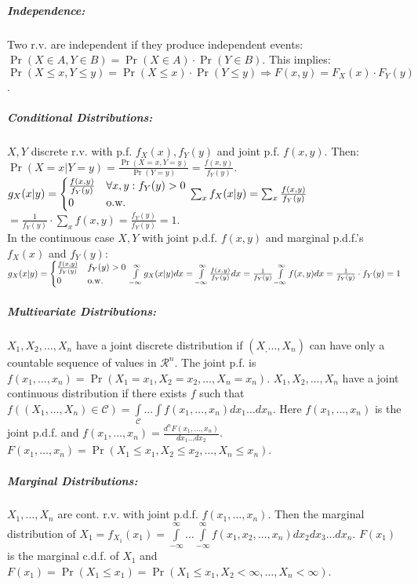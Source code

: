 \documentclass[landscape,10pt]{article}
\begin{document}
\begin{multicols}{4}
    \subparagraph*{Independence: }
        Two r.v. are independent if they produce independent events: \(\Pr(X \in A, Y \in B) = \Pr(X \in A) \cdot \Pr(Y \in B)\). This implies: \(\Pr(X \leq x, Y \leq y) = \Pr(X \leq x) \cdot \Pr(Y \leq y) \Rightarrow F(x,y) = F_X(x) \cdot F_Y(y)\).

    \subparagraph*{Conditional Distributions: }
        \(X, Y\) discrete r.v. with p.f. \(f_X(x), f_Y(y)\) and joint p.f. \(f(x,y)\). Then: \\
        \(\Pr(X = x | Y = y) = \frac{\Pr(X = x, Y = y)}{\Pr(Y = y)} = \frac{f(x,y)}{f_Y(y)}\). \\
        \(g_X(x|y) = \begin{cases} \frac{f(x,y)}{f_Y(y)} & \forall x,y: f_Y(y) > 0 \\ 0 & \text{o.w.}\end{cases} \\
        \sum_x{f_X(x|y)} = \sum_x{\frac{f(x,y)}{f_Y(y)}} \)
             \(= \frac{1}{f_Y(y)} \cdot \sum_x{f(x,y)} = \frac{f_Y(y)}{f_Y(y)} = 1\). \\
    In the continuous case \(X, Y\) with joint p.d.f. \(f(x,y)\) and marginal p.d.f.'s \(f_X(x)\) and \(f_Y(y)\): \\
    \(g_X(x|y) = \begin{cases} \frac{f(x,y)}{f_Y(y)} & f_Y(y) > 0 \\ 0 & \text{o.w.} \end{cases} \\
    \int\limits_{-\infty}^{\infty}g_X(x|y)dx = \int\limits_{-\infty}^{\infty} \frac{f(x,y)}{f_Y(y)}dx = \frac{1}{f_Y(y)} \int\limits_{-\infty}^{\infty}f(x,y)dx = \frac{1}{f_Y(y)} \cdot f_Y(y) = 1\)

\subparagraph*{Multivariate Distributions:}
 \(X_1, X_2, \ldots, X_n\) have a joint discrete distribution if \((X_, \dots, X_n)\) can have only a countable sequence of values in \(\mathcal{R}^n\). The joint p.f. is \(f(x_1,\dots,x_n) = \Pr(X_1=x_1, X_2=x_2,\ldots,X_n=x_n)\). \(X_1, X_2, \ldots, X_n\) have a joint continuous distribution if there exists \(f\) such that \(f\left((X_1,\ldots,X_n)\in \mathcal{C}\right) = \int\limits_{\mathcal{C}}\dots\int f(x_1,\ldots,x_n)dx_1\ldots dx_n\). Here \(f(x_1,\ldots,x_n)\) is the joint p.d.f. and \(f(x_1,\ldots,x_n) = \frac{d^nF(x_1,\ldots,x_n)}{dx_1\ldots dx_2}\). \(F(x_1,\ldots,x_n) = \Pr(X_1 \leq x_1, X_2 \leq x_2, \ldots, X_n \leq x_n)\).

 \subparagraph*{Marginal Distributions: }
    \(X_1, \ldots, X_n\) are cont. r.v. with joint p.d.f. \(f(x_1, \ldots, x_n)\). Then the marginal distribution of \(X_1 = f_{X_1}(x_1) = \int\limits_{- \infty}^{\infty} \dots \int\limits_{- \infty}^{\infty} f(x_1,x_2, \ldots, x_n)dx_2dx_3\ldots dx_n\). \(F(x_1)\) is the marginal c.d.f. of \(X_1\) and \(F(x_1) = \Pr(X_1 \leq x_1) = \Pr(X_1 \leq x_1, X_2 < \infty, \ldots, X_n < \infty)\).


\end{multicols}
\end{document}
